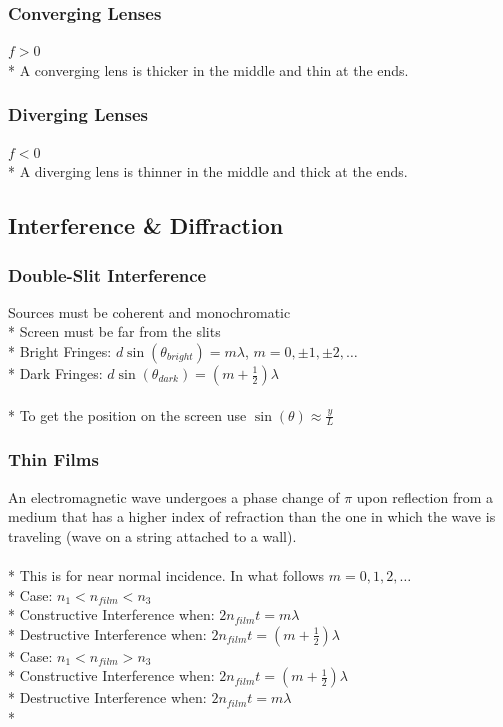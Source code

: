 \subsubsection{Converging Lenses}
\(f>0\)\\*
A converging lens is thicker in the middle and thin at the ends.

\subsubsection{Diverging Lenses}
\(f<0\)\\*
A diverging lens is thinner in the middle and thick at the ends.

\subsection{Interference \& Diffraction}

\subsubsection{ Double-Slit Interference}
Sources must be coherent and monochromatic\\*
Screen must be far from the slits\\*
Bright Fringes: \(d\sin(\theta_{bright})=m\lambda\), \(m=0,\pm1,\pm2,\ldots\)\\*
Dark Fringes: \(d\sin(\theta_{dark})=\left(m+\frac{1}{2}\right)\lambda\)\\\\*
To get the position on the screen use \(\displaystyle\sin(\theta)\approx\frac{y}{L}\)

\subsubsection{Thin Films}
An electromagnetic wave undergoes a phase change of \(\pi\) upon reflection from a medium that has a higher index of refraction than the one in which the wave is traveling (wave on a string attached to a wall).\\\\*
This is for near normal incidence. In what follows \(m=0,1,2,\ldots\)\\*
Case: \(n_1<n_{film}<n_3\)\\*
Constructive Interference when: \(2n_{film}t=m\lambda\)\\*
Destructive Interference when: \(2n_{film}t=\left(m+\frac{1}{2}\right)\lambda\)\\*
Case: \(n_1<n_{film}>n_3\)\\*
Constructive Interference when: \(2n_{film}t=\left(m+\frac{1}{2}\right)\lambda\)\\*
Destructive Interference when: \(2n_{film}t=m\lambda\)\\*

